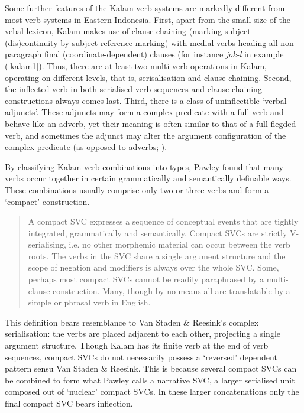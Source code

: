 Some further features of the Kalam verb systems are markedly different from most verb systems in Eastern Indonesia. First, apart from the small size of the vebal lexicon, Kalam makes use of clause-chaining (marking subject (dis)continuity by subject reference marking) with medial verbs heading all non-paragraph final (coordinate-dependent) clauses (for instance \textit{jok-l} in example (\ref{kalam1}). Thus, there are at least two multi-verb operations in Kalam, operating on different levels, that is, serisalisation and clause-chaining. Second, the inflected verb in both serialised verb sequences and clause-chaining constructions always comes last. Third, there is a class of uninflectible `verbal adjuncts'. These adjuncts may form a complex predicate with a full verb and behave like an adverb, yet their meaning is often similar to that of a full-flegded verb, and sometimes the adjunct may alter the argument configuration of the complex predicate (as opposed to adverbs; \citealt[177]{pawley2008serial}).

By classifying Kalam verb combinations into types, Pawley found that many verbs occur together in certain grammatically and semantically definable ways. These combinations usually comprise only two or three verbs and form a `compact' construction. 

\begin{quote}A compact SVC expresses a sequence of conceptual events that are tightly integrated, grammatically and semantically. Compact SVCs are strictly V-serialising, i.e. no other morphemic material can occur between the verb roots. The verbs in the SVC share a single argument structure and the scope of negation and modifiers is always over the whole SVC. Some, perhaps most compact SVCs cannot be readily paraphrased by a multi-clause construction. Many, though by no means all are translatable by a simple or phrasal verb in English. \citep[172f.]{pawley2008serial}\end{quote}

This definition bears resemblance to Van Staden \& Reesink's complex serialisation: the verbs are placed adjacent to each other, projecting a single argument structure. Though Kalam has its finite verb at the end of verb sequences, compact SVCs do not necessarily possess a `reversed' dependent pattern sensu Van Staden \& Reesink. This is because several compact SVCs can be combined to form what Pawley calls a narrative SVC, a larger serialised unit composed out of `nuclear' compact SVCs. In these larger concatenations only the final compact SVC bears inflection.

